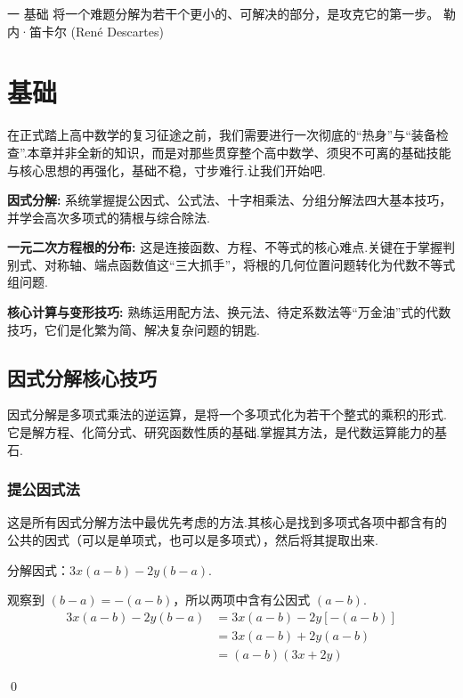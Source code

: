 	\makechapteropener
	{一} 
	{基础} 
	{将一个难题分解为若干个更小的、可解决的部分，是攻克它的第一步。} 
	{勒内·笛卡尔 (René Descartes)} 
	
	\chapter{基础}
	
	\lettrine{在}{正式踏上}高中数学的复习征途之前，我们需要进行一次彻底的“热身”与“装备检查”.本章并非全新的知识，而是对那些贯穿整个高中数学、须臾不可离的基础技能与核心思想的再强化，基础不稳，寸步难行.让我们开始吧.
	
\begin{introduction}[知识概括]
	\item \textbf{因式分解:} \label{intro:factor} 系统掌握提公因式、公式法、十字相乘法、分组分解法四大基本技巧，并学会高次多项式的猜根与综合除法.
	\item \textbf{一元二次方程根的分布:} \label{intro:roots_dist} 这是连接函数、方程、不等式的核心难点.关键在于掌握判别式、对称轴、端点函数值这“三大抓手”，将根的几何位置问题转化为代数不等式组问题.
	\item \textbf{核心计算与变形技巧:} \label{intro:techniques} 熟练运用配方法、换元法、待定系数法等“万金油”式的代数技巧，它们是化繁为简、解决复杂问题的钥匙.
\end{introduction}
	
	\section{因式分解核心技巧}
	
	因式分解是多项式乘法的逆运算，是将一个多项式化为若干个整式的乘积的形式.它是解方程、化简分式、研究函数性质的基础.掌握其方法，是代数运算能力的基石.
	
	\subsection{提公因式法}
	这是所有因式分解方法中最优先考虑的方法.其核心是找到多项式各项中都含有的公共的因式（可以是单项式，也可以是多项式），然后将其提取出来.
	\begin{exercise}
		分解因式：$3x(a-b) - 2y(b-a)$.
	\end{exercise}
	\begin{solution}
		观察到 $(b-a) = -(a-b)$，所以两项中含有公因式 $(a-b)$.
		\begin{align*}
			3x(a-b) - 2y(b-a) &= 3x(a-b) - 2y[-(a-b)] \\
			&= 3x(a-b) + 2y(a-b) \\
			&= (a-b)(3x+2y)
		\end{align*}
	\end{solution}
	\qed
	
